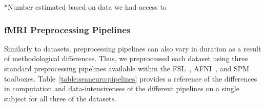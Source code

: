     \begin{table}[t]
      \small\centering
     \footnotesize{*Number estimated based on data we had access
    to}\\
    \caption{Dataset characteristics. Compressed size is listed, since all
    applications, except for SPM, processed compressed
    data}\label{table:sea-neuro:data}
    \end{table}
    
    
    
    \subsubsection{fMRI Preprocessing Pipelines}
    
    Similarly to datasets, preprocessing pipelines can also vary in duration as
    a result of methodological differences. Thus, we preprocessed each dataset
    using three standard preprocessing pipelines available within the FSL~\cite{fsl},
    AFNI~\cite{cox1996afni}, and SPM~\cite{spm} toolboxes.
    Table~\ref{table:seaneuro:pipelines} provides a reference of the differences
    in computation and data-intensiveness of the different pipelines on a single
    subject for all three of the datasets.
    
